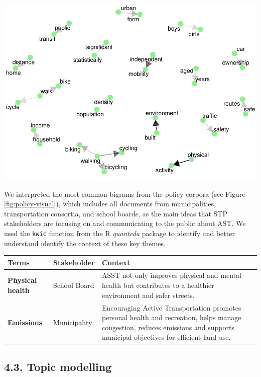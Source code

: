 \documentclass[]{elsarticle} %
\begin{document}
\includegraphics{AST-Framing-Ontario_files/figure-latex/unnamed-chunk-10-1.pdf}

We interpreted the most common bigrams from the policy corpora (see
Figure \ref{fig:policy-visual}), which includes all documents from
municipalities, transportation consortia, and school boards, as the main
ideas that STP stakeholders are focusing on and communicating to the
public about AST. We used the \texttt{kwic} function from the R
\emph{quanteda} package to identify and better understand identify the
context of these key themes.

\begin{table}
\centering
\begin{tabular}[t]{>{}l|l|>{\raggedright\arraybackslash}p{30em}}
\hline
Terms & Stakeholder & Context\\
\hline
\textbf{Physical health} & School Board & ASST not only improves physical and mental health but contributes to a healthier environment and safer streets.\\
\hline
\textbf{Emissions} & Municipality & Encouraging Active Transportation promotes personal health and recreation, helps manage congestion, reduces emissions and supports municipal objectives for efficient land use.\\
\hline
\end{tabular}
\end{table}

\hypertarget{topic-modelling}{%
\subsection{4.3. Topic modelling}\label{topic-modelling}}
\end{document}
